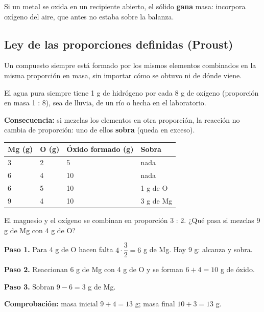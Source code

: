 \begin{clave} Si un metal se oxida en un recipiente abierto, el sólido \textbf{gana} masa: incorpora oxígeno del aire, que antes no estaba sobre la balanza.\end{clave}
\subsection{Ley de las proporciones definidas (Proust)}
\begin{clave} Un compuesto siempre está formado por los mismos elementos combinados en la misma proporción en masa, sin importar cómo se obtuvo ni de dónde viene.\end{clave}
 

El agua pura siempre tiene 1 g de hidrógeno por cada 8 g de oxígeno (proporción en masa 1 : 8), sea de lluvia, de un río o hecha en el laboratorio.

 

\textbf{Consecuencia:} si mezclas los elementos en otra proporción, la reacción no cambia de proporción: uno de ellos \textbf{sobra} (queda en exceso).

 
\begin{center}\small
\begin{tabular}{@{}llll@{}}
\toprule
\textbf{Mg (g)} & \textbf{O (g)} & \textbf{Óxido formado (g)} & \textbf{Sobra} \\
\midrule
3 & 2 & 5 & nada \\
6 & 4 & 10 & nada \\
6 & 5 & 10 & 1 g de O \\
9 & 4 & 10 & 3 g de Mg \\
\bottomrule
\end{tabular}
\end{center}
  
\begin{ejemplo} El magnesio y el oxígeno se combinan en proporción 3 : 2. ¿Qué pasa si mezclas 9 g de Mg con 4 g de O?\par \textbf{Paso 1.} Para 4 g de O hacen falta $4\cdot\dfrac{3}{2} = 6$ g de Mg. Hay 9 g: alcanza y sobra.\par \textbf{Paso 2.} Reaccionan 6 g de Mg con 4 g de O y se forman $6 + 4 = 10$ g de óxido.\par \textbf{Paso 3.} Sobran $9 - 6 = 3$ g de Mg.\par \textbf{Comprobación:} masa inicial $9 + 4 = 13$ g; masa final $10 + 3 = 13$ g. \end{ejemplo}
 
